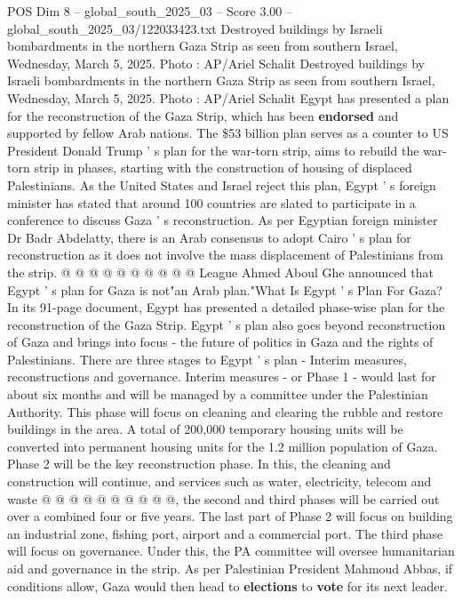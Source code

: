 \begin{textsample}{POS Dim 8 – global\_south\_2025\_03 – Score 3.00 – global\_south\_2025\_03/122033423.txt}  \label{ex:f8_pos_387}
Destroyed buildings by Israeli bombardments in the northern Gaza Strip as seen from southern Israel, Wednesday, March 5, 2025.
Photo : AP/Ariel Schalit Destroyed buildings by Israeli bombardments in the northern Gaza Strip as seen from southern Israel, Wednesday, March 5, 2025.
Photo : AP/Ariel Schalit Egypt has presented a plan for the reconstruction of the Gaza Strip, which has been \textbf{endorsed} and supported by fellow Arab nations.
The \$53 billion plan serves as a counter to US President Donald Trump ' s plan for the war-torn strip, aims to rebuild the war-torn strip in phases, starting with the construction of housing of displaced Palestinians.
As the United States and Israel reject this plan, Egypt ' s foreign minister has stated that around 100 countries are slated to participate in a conference to discuss Gaza ' s reconstruction.
As per Egyptian foreign minister Dr Badr Abdelatty, there is an Arab consensus to adopt Cairo ' s plan for reconstruction as it does not involve the mass displacement of Palestinians from the strip. @ @ @ @ @ @ @ @ @ @ League Ahmed Aboul Ghe announced that Egypt ' s plan for Gaza is not"an Arab plan."What Is Egypt ' s Plan For Gaza?
In its 91-page document, Egypt has presented a detailed phase-wise plan for the reconstruction of the Gaza Strip.
Egypt ' s plan also goes beyond reconstruction of Gaza and brings into focus - the future of politics in Gaza and the rights of Palestinians.
There are three stages to Egypt ' s plan - Interim measures, reconstructions and governance.
Interim measures - or Phase 1 - would last for about six months and will be managed by a committee under the Palestinian Authority.
This phase will focus on cleaning and clearing the rubble and restore buildings in the area.
A total of 200,000 temporary housing units will be converted into permanent housing units for the 1.2 million population of Gaza.
Phase 2 will be the key reconstruction phase.
In this, the cleaning and construction will continue, and services such as water, electricity, telecom and waste @ @ @ @ @ @ @ @ @ @, the second and third phases will be carried out over a combined four or five years.
The last part of Phase 2 will focus on building an industrial zone, fishing port, airport and a commercial port.
The third phase will focus on governance.
Under this, the PA committee will oversee humanitarian aid and governance in the strip.
As per Palestinian President Mahmoud Abbas, if conditions allow, Gaza would then head to \textbf{elections} to \textbf{vote} for its next leader.

\end{textsample}
